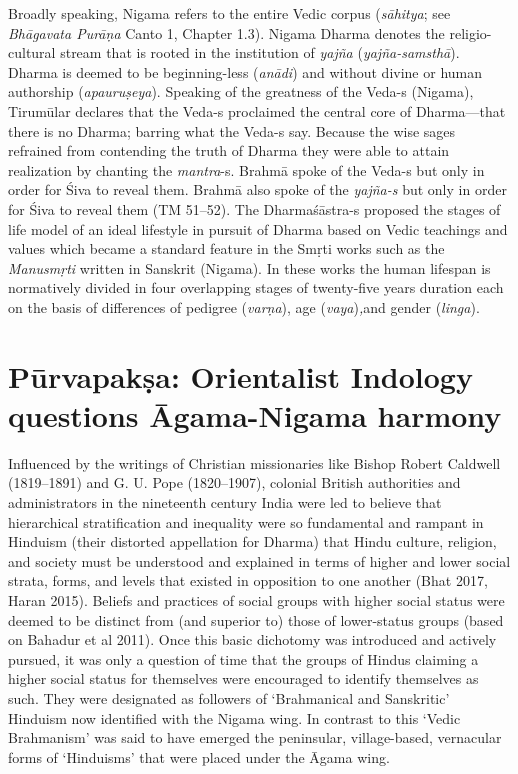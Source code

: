 Broadly speaking, Nigama refers to the entire Vedic corpus (\textit{sāhitya}; see \textit{Bhāgavata Purāṇa} Canto 1, Chapter 1.3). Nigama Dharma denotes the religio-cultural stream that is rooted in the institution of \textit{yajña} (\textit{yajña-samsthā}). Dharma is deemed to be beginning-less (\textit{anādi}) and without divine or human authorship (\textit{apauruṣeya}). Speaking of the greatness of the Veda-s (Nigama), Tirumūlar declares that the Veda-s proclaimed the central core of Dharma—that there is no Dharma; barring what the Veda-s say. Because the wise sages refrained from contending the truth of Dharma they were able to attain realization by chanting the \textit{mantra}-s. Brahmā spoke of the Veda-s but only in order for Śiva to reveal them. Brahmā also spoke of the \textit{yajña-s} but only in order for Śiva to reveal them (TM 51–52). The Dharmaśāstra-s proposed the stages of life model of an ideal lifestyle in pursuit of Dharma based on Vedic teachings and values which became a standard feature in the Smṛti works such as the \textit{Manusmṛti}  written in Sanskrit (Nigama). In these works the human lifespan is normatively divided in four overlapping stages of twenty-five years duration each on the basis of differences of pedigree (\textit{varṇa}), age (\textit{vaya})\textit{,}and gender (\textit{linga}).


\section*{Pūrvapakṣa: Orientalist Indology questions Āgama-Nigama harmony}

Influenced by the writings of Christian missionaries like Bishop Robert Caldwell (1819–1891) and G. U. Pope (1820–1907), colonial British authorities and administrators in the nineteenth century India were led to believe that hierarchical stratification and inequality were so fundamental and rampant in Hinduism (their distorted appellation for Dharma) that Hindu culture, religion, and society must be understood and explained in terms of higher and lower social strata, forms, and levels that existed in opposition to one another (Bhat 2017, Haran 2015). Beliefs and practices of social groups with higher social status were deemed to be distinct from (and superior to) those of lower-status groups (based on Bahadur et al 2011). Once this basic dichotomy was introduced and actively pursued, it was only a question of time that the groups of Hindus claiming a higher social status for themselves were encouraged to identify themselves as such. They were designated as followers of ‘Brahmanical and Sanskritic’ Hinduism now identified with the Nigama wing. In contrast to this ‘Vedic Brahmanism’ was said to have emerged the peninsular, village-based, vernacular forms of ‘Hinduisms’ that were placed under the Āgama wing.


